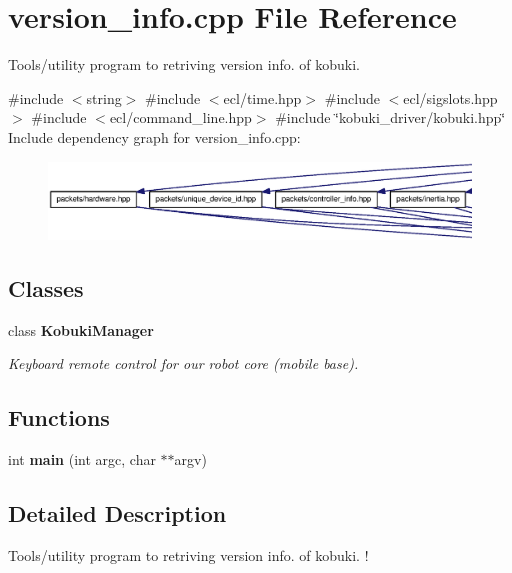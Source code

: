 \section{version\-\_\-info.\-cpp \-File \-Reference}
\label{version__info_8cpp}


\-Tools/utility program to retriving version info. of kobuki.  


{\ttfamily \#include $<$string$>$}\*
{\ttfamily \#include $<$ecl/time.\-hpp$>$}\*
{\ttfamily \#include $<$ecl/sigslots.\-hpp$>$}\*
{\ttfamily \#include $<$ecl/command\-\_\-line.\-hpp$>$}\*
{\ttfamily \#include \char`\"{}kobuki\-\_\-driver/kobuki.\-hpp\char`\"{}}\*
\-Include dependency graph for version\-\_\-info.\-cpp\-:
\nopagebreak
\begin{figure}[H]
\begin{center}
\leavevmode
\includegraphics[width=350pt]{version__info_8cpp__incl}
\end{center}
\end{figure}
\subsection*{\-Classes}
\begin{DoxyCompactItemize}
\item 
class {\bf \-Kobuki\-Manager}
\begin{DoxyCompactList}\small\item\em \-Keyboard remote control for our robot core (mobile base). \end{DoxyCompactList}\end{DoxyCompactItemize}
\subsection*{\-Functions}
\begin{DoxyCompactItemize}
\item 
int {\bf main} (int argc, char $\ast$$\ast$argv)
\end{DoxyCompactItemize}


\subsection{\-Detailed \-Description}
\-Tools/utility program to retriving version info. of kobuki. ! 

